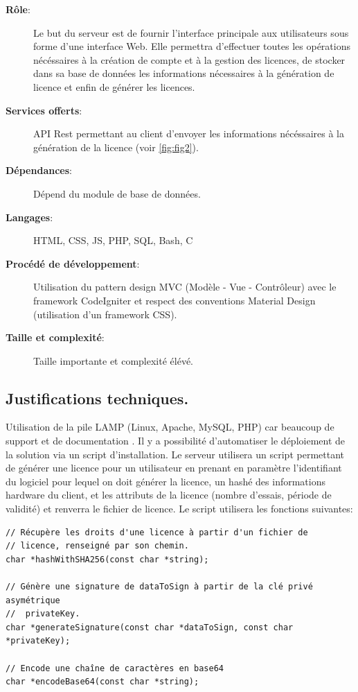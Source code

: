 \begin{description}
	\item[\textbf{Rôle}:]
	    Le but du serveur est de fournir l'interface principale aux utilisateurs sous forme d'une interface Web.
	    Elle permettra d'effectuer toutes les opérations nécéssaires à la création de compte et à la gestion des
	    licences, de stocker dans sa base de données les informations nécessaires à la génération de licence
        et enfin de générer les licences.
	\item[\textbf{Services offerts}:]
				API Rest \cite{REST} permettant au client d'envoyer les informations
				nécéssaires à la génération de la licence (voir \ref{fig:fig2}).			
	\item[\textbf{Dépendances}:]
				Dépend du module de base de données.
	\item[\textbf{Langages}:]
				HTML, CSS, JS, PHP, SQL, Bash, C 
	\item[\textbf{Procédé de développement}:]
				Utilisation du pattern design MVC (Modèle - Vue - Contrôleur) avec le framework
                CodeIgniter \cite{igniter} et respect des conventions Material Design
                \cite{Material} (utilisation d'un framework CSS).
	\item[\textbf{Taille et complexité}:]
				Taille importante et complexité élévé.
\end{description}

\subsection{Justifications techniques.}
Utilisation de la pile LAMP (Linux, Apache, MySQL, PHP) car beaucoup de 
support et de documentation \cite{LAMP}. Il y a possibilité d'automatiser 
le déploiement de la solution via un script d'installation. \newline
Le serveur utilisera un script permettant de générer une licence pour un 
utilisateur en prenant en paramètre l'identifiant du logiciel pour lequel on doit 
générer la licence, un hashé des informations hardware du client, et les
attributs de la licence (nombre d'essais, période de validité) et renverra
le fichier de licence. Le script utilisera les fonctions suivantes:

\begin{verbatim}
// Récupère les droits d'une licence à partir d'un fichier de
// licence, renseigné par son chemin.
char *hashWithSHA256(const char *string);

// Génère une signature de dataToSign à partir de la clé privé asymétrique 
//  privateKey. 
char *generateSignature(const char *dataToSign, const char *privateKey);
  
// Encode une chaîne de caractères en base64
char *encodeBase64(const char *string);
\end{verbatim}

